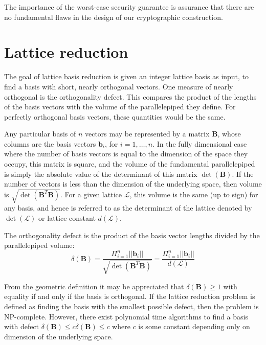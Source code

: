 The importance of the worst-case security guarantee is assurance  that there are no fundamental flaws in the design of our cryptographic construction.

\section{Lattice reduction}
The goal of lattice basis reduction is given an integer lattice basis as input, to find a basis with short, nearly orthogonal vectors. One measure of nearly orthogonal is the orthogonality defect. This compares the product of the lengths of the basis vectors with the volume of the parallelepiped they define. For perfectly orthogonal basis vectors, these quantities would be the same.

Any particular basis of $n$ vectors may be represented by a matrix $\textbf{B}$, whose columns are the basis vectors $\textbf{b}_{i}$, for $i=1, \dots, n$. In the fully dimensional case where the number of basis vectors is equal to the dimension of the space they occupy, this matrix is square, and the volume of the fundamental parallelepiped is simply the absolute value of the determinant of this matrix $\det(\textbf{B})$. If the number of vectors is less than the dimension of the underlying space, then volume is ${\sqrt {\det(\textbf{B}^{T}\textbf{B})}}$. For a given lattice $\mathcal{L}$, this volume is the same (up to sign) for any basis, and hence is referred to as the determinant of the lattice denoted by $\det(\mathcal{L})$ or lattice constant $d(\mathcal{L})$.

The orthogonality defect is the product of the basis vector lengths divided by the parallelepiped volume:
\begin{equation}
\delta (\textbf{B})= \frac{\Pi_{i=1}^{n}||\textbf{b}_{i}||}{\sqrt {\det(\textbf{B}^{T}\textbf{B})}} = \frac{\Pi _{i=1}^{n}||\textbf{b}_{i}||}{d(\mathcal{L} )}
\end{equation}

From the geometric definition it may be appreciated that $\delta (\textbf{B})\geq 1$ with equality if and only if the basis is orthogonal. If the lattice reduction problem is defined as finding the basis with the smallest possible defect, then the problem is NP-complete. However, there exist polynomial time algorithms to find a basis with defect $\delta (\textbf{B})\leq c \delta (\textbf{B})\leq c$ where $c$ is some constant depending only on dimension of the underlying space.

